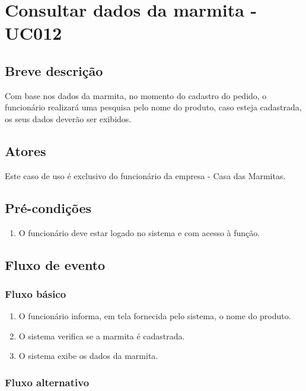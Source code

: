 \chapter{Consultar dados da marmita - UC012} \label{uc012}

\section{Breve descrição}

Com base nos dados da marmita, no momento do cadastro do pedido, o funcionário realizará uma pesquisa pelo nome do produto, caso esteja cadastrada, os seus dados deverão ser exibidos.

\section{Atores}

Este caso de uso é exclusivo do funcionário da empresa - Casa das Marmitas.

\section{Pré-condições}

\begin{enumerate}
	\item O funcionário deve estar logado no sistema e com acesso à função.
\end{enumerate}

\section{Fluxo de evento}

\subsection{Fluxo básico}

\begin{enumerate}
	\item O funcionário informa, em tela fornecida pelo sistema, o nome do produto.	
	\item O sistema verifica se a marmita é cadastrada.
	\item O sistema exibe os dados da marmita.
\end{enumerate}

\subsection{Fluxo alternativo}

